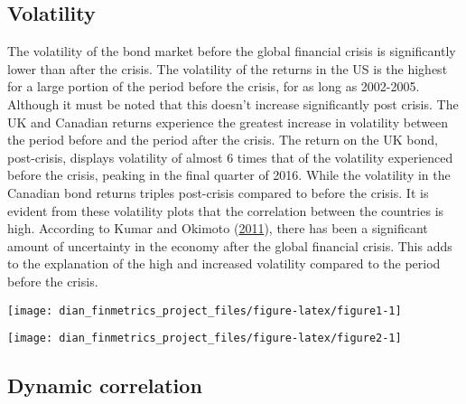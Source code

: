 \documentclass[11pt,preprint, authoryear]{elsarticle}
\let\origfigure\figure
\let\endorigfigure\endfigure
\renewenvironment{figure}[1][2] {
    \expandafter\origfigure\expandafter[H]
} {
    \endorigfigure
}
\numberwithin{equation}{section}
\numberwithin{figure}{section}
\numberwithin{table}{section}
\begin{document}
\subsection{\texorpdfstring{Volatility
\label{volatility}}{Volatility }}\label{volatility}

The volatility of the bond market before the global financial crisis is
significantly lower than after the crisis. The volatility of the returns
in the US is the highest for a large portion of the period before the
crisis, for as long as 2002-2005. Although it must be noted that this
doesn't increase significantly post crisis. The UK and Canadian returns
experience the greatest increase in volatility between the period before
and the period after the crisis. The return on the UK bond, post-crisis,
displays volatility of almost 6 times that of the volatility experienced
before the crisis, peaking in the final quarter of 2016. While the
volatility in the Canadian bond returns triples post-crisis compared to
before the crisis. It is evident from these volatility plots that the
correlation between the countries is high. According to Kumar and
Okimoto (\protect\hyperlink{ref-kumar2011}{2011}), there has been a
significant amount of uncertainty in the economy after the global
financial crisis. This adds to the explanation of the high and increased
volatility compared to the period before the crisis.

\begin{figure}[H]

{\centering \texttt{[image: dian\_finmetrics\_project\_files/figure-latex/figure1-1]} 

}

\caption{Volatility plot \label{lit}}\label{fig:figure1}
\end{figure}

\begin{figure}[H]

{\centering \texttt{[image: dian\_finmetrics\_project\_files/figure-latex/figure2-1]} 

}

\caption{Volatility plot post-crisis \label{lit}}\label{fig:figure2}
\end{figure}

\subsection{\texorpdfstring{Dynamic correlation
\label{corr}}{Dynamic correlation }}\label{dynamic-correlation}
\end{document}
